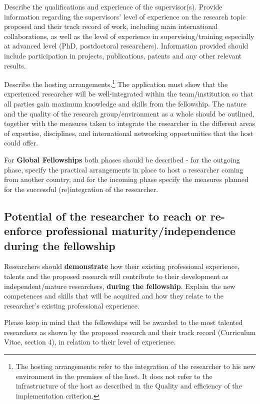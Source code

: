 Describe the qualifications and experience of the supervisor(s).
Provide information regarding the supervisors' level of experience
on the research topic proposed and their track record of work,
including main international collaborations, as well as the level
of experience in supervising/training especially at advanced level
(PhD, postdoctoral researchers). Information provided should
include participation in projects, publications, patents and any
other relevant results.

Describe the hosting arrangements.\footnote{The hosting
arrangements refer to the integration of the researcher to his new
environment in the premises of the host. It does not refer to the
infrastructure of the host as described in the Quality and
efficiency of the implementation criterion.} The application must
show that the experienced researcher will be well-integrated
within the team/institution so that all parties gain maximum
knowledge and skills from the fellowship. The nature and the
quality of the research group/environment as a whole should be
outlined, together with the measures taken to integrate the
researcher in the different areas of expertise, disciplines, and
international networking opportunities that the host could offer.

For \textbf{Global Fellowships} both phases should be described - for the outgoing phase, specify the practical arrangements in place to host a researcher coming from another country, and for the incoming phase specify the measures planned for the successful (re)integration of the researcher.


\subsection{Potential of the researcher to reach or re-enforce
professional maturity/independence during the fellowship}
\label{sec:excellence_maturity}

Researchers should \textbf{demonstrate} how their existing
professional experience, talents and the proposed research will
contribute to their development as independent/mature researchers,
\textbf{during the fellowship}. Explain the new competences and
skills that will be acquired and how they relate to the
researcher’s existing professional experience.

Please keep in mind that the fellowships will be awarded to the
most talented researchers as shown by the proposed research and
their track record (Curriculum Vitae, section 4), in relation to
their level of experience.

